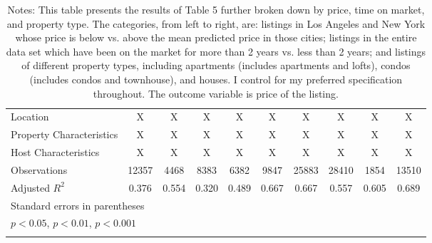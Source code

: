 \begin{landscape}
{\begin{longtable}{l*{9}{c}}
\hspace{3mm} Location  &                           X      & X & X & X & X & X &  X & X & X\\
\hspace{3mm} Property Characteristics  &   X  & X & X & X & X & X &  X & X & X\\
\hspace{3mm} Host Characteristics  &         X& X & X & X & X & X &  X & X & X\\
\hline
Observations        &       12357         &        4468         &        8383         &        6382         &        9847         &       25883         &       28410         &        1854         &       13510         \\
Adjusted \(R^{2}\)  &       0.376         &       0.554         &       0.320         &       0.489         &       0.667         &       0.667         &       0.557         &       0.605         &       0.689         \\
\hline\hline
\multicolumn{10}{l}{\footnotesize Standard errors in parentheses}\\
\multicolumn{10}{l}{\footnotesize \sym{*} \(p<0.05\), \sym{**} \(p<0.01\), \sym{***} \(p<0.001\)}\\
\caption*{Notes: This table presents the results of Table 5 further broken down by price, time on market, and property type. The categories, from left to right, are: listings in Los Angeles and New York whose price is below vs. above the mean predicted price in those cities; listings in the entire data set which have been on the market for more than 2 years vs. less than 2 years; and listings of different property types, including apartments (includes apartments and lofts), condos (includes condos and townhouse), and houses. I control for my preferred specification throughout. The outcome variable is price of the listing.}\\
\end{longtable}
}

\end{landscape}

